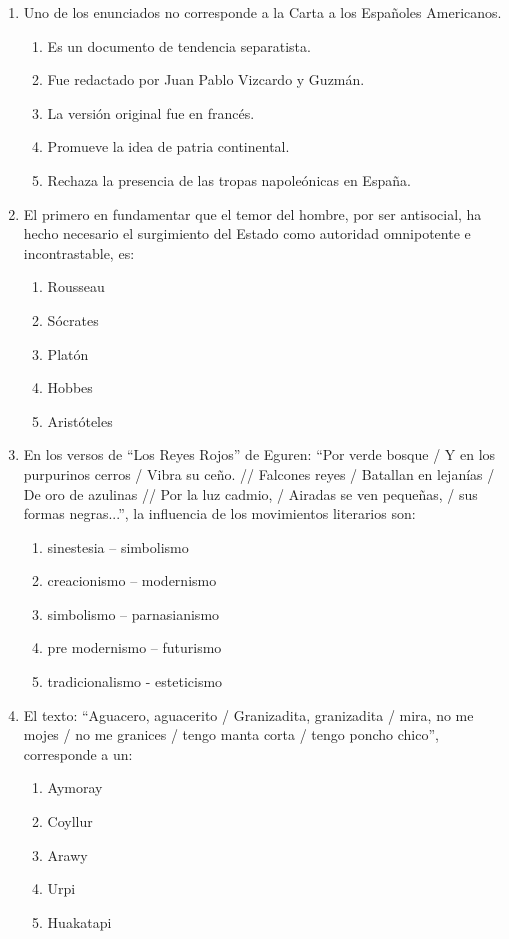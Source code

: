 \begin{enumerate}
	\item Uno de los enunciados no corresponde a la Carta a los Españoles Americanos.
	\begin{enumerate}[label=\alph*)]
		\item Es un documento de tendencia separatista.
		\item Fue redactado por Juan Pablo Vizcardo y Guzmán.
		\item La versión original fue en francés.
		\item Promueve la idea de patria continental.
		\item Rechaza la presencia de las tropas napoleónicas en España.
	\end{enumerate}
	
	\item El primero en fundamentar que el temor del hombre, por ser antisocial, ha hecho necesario el surgimiento del Estado como autoridad omnipotente e incontrastable, es:
	\begin{enumerate}[label=\alph*)]
		\item Rousseau
		\item Sócrates
		\item Platón
		\item Hobbes
		\item Aristóteles
	\end{enumerate}
	
	\item En los versos de “Los Reyes Rojos” de Eguren: “Por verde bosque / Y en los purpurinos cerros / Vibra su ceño. // Falcones reyes / Batallan en lejanías / De oro de azulinas // Por la luz cadmio, / Airadas se ven pequeñas, / sus formas negras...”, la influencia de los movimientos literarios son:
	\begin{enumerate}[label=\alph*)]
		\item sinestesia -- simbolismo
		\item creacionismo -- modernismo
		\item simbolismo -- parnasianismo
		\item pre modernismo -- futurismo
		\item tradicionalismo - esteticismo
	\end{enumerate}
	
	\item El texto: “Aguacero, aguacerito / Granizadita, granizadita / mira, no me mojes / no me granices / tengo manta corta / tengo poncho chico”, corresponde a un:
	\begin{enumerate}[label=\alph*)]
		\item Aymoray
		\item Coyllur
		\item Arawy
		\item Urpi
		\item Huakatapi
	\end{enumerate}
	

\end{enumerate}
